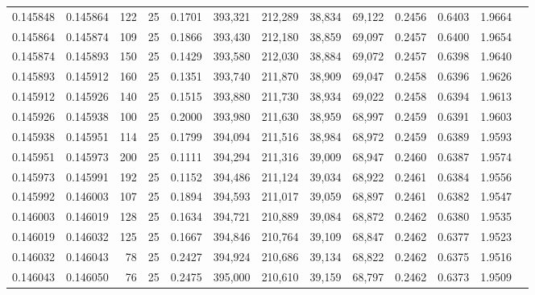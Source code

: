 \begin{tabular}{rrrrrrrrrrrrr}
0.145848 & 0.145864 &   122 &  25 &                                     0.1701 & 393,321 & 212,289 &  38,834 &  69,122 & 0.2456 & 0.6403 & 1.9664 \\
0.145864 & 0.145874 &   109 &  25 &                                     0.1866 & 393,430 & 212,180 &  38,859 &  69,097 & 0.2457 & 0.6400 & 1.9654 \\
0.145874 & 0.145893 &   150 &  25 &                                     0.1429 & 393,580 & 212,030 &  38,884 &  69,072 & 0.2457 & 0.6398 & 1.9640 \\
0.145893 & 0.145912 &   160 &  25 &                                     0.1351 & 393,740 & 211,870 &  38,909 &  69,047 & 0.2458 & 0.6396 & 1.9626 \\
0.145912 & 0.145926 &   140 &  25 &                                     0.1515 & 393,880 & 211,730 &  38,934 &  69,022 & 0.2458 & 0.6394 & 1.9613 \\
0.145926 & 0.145938 &   100 &  25 &                                     0.2000 & 393,980 & 211,630 &  38,959 &  68,997 & 0.2459 & 0.6391 & 1.9603 \\
0.145938 & 0.145951 &   114 &  25 &                                     0.1799 & 394,094 & 211,516 &  38,984 &  68,972 & 0.2459 & 0.6389 & 1.9593 \\
0.145951 & 0.145973 &   200 &  25 &                                     0.1111 & 394,294 & 211,316 &  39,009 &  68,947 & 0.2460 & 0.6387 & 1.9574 \\
0.145973 & 0.145991 &   192 &  25 &                                     0.1152 & 394,486 & 211,124 &  39,034 &  68,922 & 0.2461 & 0.6384 & 1.9556 \\
0.145992 & 0.146003 &   107 &  25 &                                     0.1894 & 394,593 & 211,017 &  39,059 &  68,897 & 0.2461 & 0.6382 & 1.9547 \\
0.146003 & 0.146019 &   128 &  25 &                                     0.1634 & 394,721 & 210,889 &  39,084 &  68,872 & 0.2462 & 0.6380 & 1.9535 \\
0.146019 & 0.146032 &   125 &  25 &                                     0.1667 & 394,846 & 210,764 &  39,109 &  68,847 & 0.2462 & 0.6377 & 1.9523 \\
0.146032 & 0.146043 &    78 &  25 &                                     0.2427 & 394,924 & 210,686 &  39,134 &  68,822 & 0.2462 & 0.6375 & 1.9516 \\
0.146043 & 0.146050 &    76 &  25 &                                     0.2475 & 395,000 & 210,610 &  39,159 &  68,797 & 0.2462 & 0.6373 & 1.9509 \\

\end{tabular}
